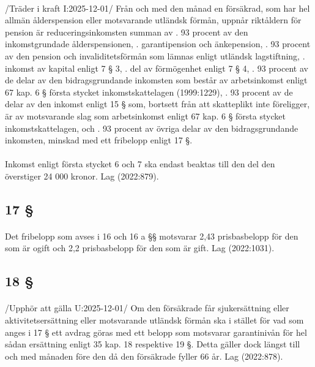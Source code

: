 \documentclass[a4paper,notitlepage,openany,10pt]{book}
\begin{document}
\paragraph*{}
/Träder i kraft I:2025-12-01/
Från och med den månad en försäkrad, som har hel allmän ålderspension eller motsvarande utländsk förmån, uppnår riktåldern för pension är reduceringsinkomsten summan av
. 93 procent av den inkomstgrundade ålderspensionen,
. garantipension och änkepension,
. 93 procent av den pension och invaliditetsförmån som lämnas enligt utländsk lagstiftning,
. inkomst av kapital enligt 7 § 3,
. del av förmögenhet enligt 7 § 4,
. 93 procent av de delar av den bidragsgrundande inkomsten som består av arbetsinkomst enligt 67 kap. 6 § första stycket inkomstskattelagen (1999:1229),
. 93 procent av de delar av den inkomst enligt 15 § som, bortsett från att skatteplikt inte föreligger, är av motsvarande slag som arbetsinkomst enligt 67 kap. 6 § första stycket inkomstskattelagen, och
. 93 procent av övriga delar av den bidragsgrundande inkomsten, minskad med ett fribelopp enligt 17 §.
\paragraph*{}
Inkomst enligt första stycket 6 och 7 ska endast beaktas till den del den överstiger 24 000 kronor.
Lag (2022:879).
\subsection*{17 §}
\paragraph*{}
Det fribelopp som avses i 16 och 16 a §§ motsvarar 2,43 prisbasbelopp för den som är ogift och 2,2 prisbasbelopp för den som är gift.
Lag (2022:1031).
\subsection*{18 §}
\paragraph*{}
/Upphör att gälla U:2025-12-01/
Om den försäkrade får sjukersättning eller aktivitetsersättning eller motsvarande utländsk förmån ska i stället för vad som anges i 17 § ett avdrag göras med ett belopp som motsvarar garantinivån för hel sådan ersättning enligt 35 kap. 18 respektive 19 §. Detta gäller dock längst till och med månaden före den då den försäkrade fyller 66 år.
Lag (2022:878).
\end{document}
